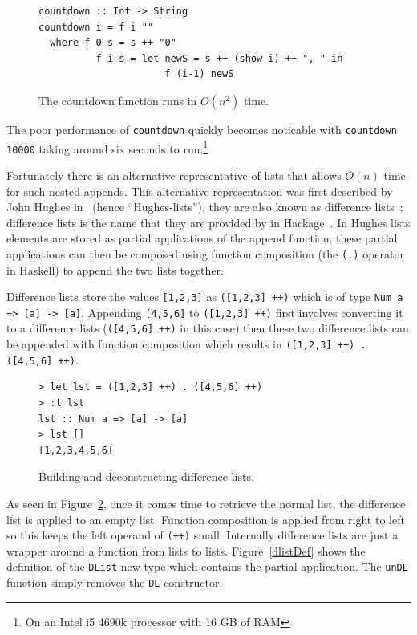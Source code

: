 \begin{figure}[t]
\begin{lstlisting}
countdown :: Int -> String
countdown i = f i ""
  where f 0 s = s ++ "0"
          f i s = let newS = s ++ (show i) ++ ", " in
                      f (i-1) newS
\end{lstlisting}
\caption{The countdown function runs in $O(n^2)$ time.}
\label{countdown}
\end{figure}

The poor performance of \texttt{countdown} quickly becomes noticable with \texttt{countdown 10000} taking around six seconds to run.\footnote{On an Intel i5 4690k processor with 16 GB of RAM}

Fortunately there is an alternative representative of lists that allows $O(n)$ time for such nested appends. This alternative representation was first described by John Hughes in~\citep{hughesList} (hence ``Hughes-lists''), they are also known as difference lists~\citep{realWorldHaskell}; difference lists is the name that they are provided by in Hackage~\citep{dlist}. In Hughes lists elements are stored as partial applications of the append function, these partial applications can then be composed using function composition (the \texttt{(.)} operator in Haskell) to append the two lists together. 

Difference lists store the values \texttt{[1,2,3]} as \texttt{([1,2,3] ++)} which is of type \texttt{Num a => [a] -> [a]}. Appending \texttt{[4,5,6]} to \texttt{([1,2,3] ++)} first involves converting it to a difference lists (\texttt{([4,5,6] ++)} in this case) then these two difference lists can be appended with function composition which results in \texttt{([1,2,3] ++) . ([4,5,6] ++)}. 

\begin{figure}[t]
\begin{lstlisting}
> let lst = ([1,2,3] ++) . ([4,5,6] ++)
> :t lst
lst :: Num a => [a] -> [a]
> lst []
[1,2,3,4,5,6]
\end{lstlisting}
\caption{Building and deconstructing difference lists.}
\label{ghciDList}
\end{figure}

As seen in Figure~\ref{ghciDList}, once it comes time to retrieve the normal list, the difference list is applied to an empty list. Function composition is applied from right to left so this keeps the left operand of \texttt{(++)} small. Internally difference lists are just a wrapper around a function from lists to lists. Figure~\ref{dlistDef} shows the definition of the \texttt{DList} new type which contains the partial application. The \texttt{unDL} function simply removes the \texttt{DL} constructor. 

